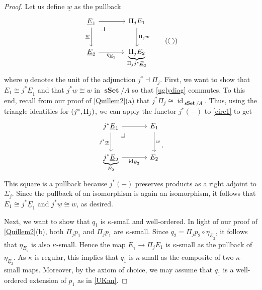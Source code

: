 \documentclass[10pt,letterpaper,cm]{nupset}
\theoremstyle{definition}
\theoremstyle{theorem}
\theoremstyle{remark}
\newcommand{\0}{\mathbf{0}}
\newcommand{\1}{\mathbf{1}}
\newcommand{\2}{\mathbf{2}}
\DeclareMathOperator{\sset}{\mathbf{sSet}}
\DeclareMathOperator{\idd}{id}
\begin{document}
\begin{proof}
Let us define $\underline{w}$ as the pullback
\[ \label{circ1}
\begin{tikzcd}[row sep=large, column sep=large]
\underline{E}_1 \arrow[r] \arrow[d, "\underline{w}"'] \arrow[dr, phantom, "\scalebox{1.5}{\color{black}$\lrcorner$}" , very near start, color=black]
& \Pi_j{E_1} \arrow[d, "\Pi_j{w}"]             \\
\underline{E}_2 \arrow[r, "\eta_{\underline{E}_2}"']                 & \underbrace{\Pi_j{E_2}}_{\Pi_jj^{\ast}{\underline{E}_2}}
\end{tikzcd}  \tag{$\bigcirc$}
\] where $\eta$  denotes the unit of the adjunction $j^{\ast} \dashv \Pi_j$.
First, we want to show that $E_1 \cong j^{\ast}{\underline{E}_1}$ and that $j^{\ast}{\underline{w}} \cong w$ in $\sset/A$ so that \eqref{uglydiag} commutes. To this end, recall from our proof of \cref{Quillem2}(a) that $j^{\ast}{\Pi_j}\cong \idd_{\sset/A}$. Thus, using the triangle identities for $\mleft(j^{\ast}, \Pi_j\mright)$, we can apply the functor $j^{\ast}({-})$ to \eqref{circ1} to get
\[
\begin{tikzcd}[row sep=large, column sep=large]
j^{\ast}{\underline{E}_1} \arrow[d, "j^{\ast}{\underline{w}}"'] \arrow[r]  \arrow[dr, phantom, "\scalebox{1.5}{\color{black}$\lrcorner$}" , very near start, color=black]
& E_1 \arrow[d, "w"] \\
\underbrace{j^{\ast}{\underline{E}_2}}_{E_2} \arrow[r, "\idd_{E_2}"']                      & E_2               
\end{tikzcd}
.\] This square is a pullback because $j^{\ast}({-})$ preserves products as a right adjoint to $\Sigma_j$. Since the pullback of an isomorphism is again an isomorphism, it follows that $E_1 \cong j^{\ast}{\underline{E}_1}$ and  $j^{\ast}{\underline{w}} \cong w$, as desired.

\medskip

Next, we want to show that  $q_1$ is $\kappa$-small and well-ordered. In light of our proof of \cref{Quillem2}(b), both $\Pi_j{p_1}$ and $\Pi_j{p_1}$ are $\kappa$-small. Since $q_2 = \Pi_j{p_2}\circ \eta_{\underline{E}_2}$, it follows that  $\eta_{\underline{E}_2}$ is also  $\kappa$-small. Hence the map $\underline{E}_1 \to \Pi_{j}{E_1}$ is $\kappa$-small as the pullback of  $\eta_{\underline{E}_2}$. As $\kappa$ is regular, this implies that $q_1$ is $\kappa$-small as the composite of two $\kappa$-small maps. Moreover, by the axiom of choice, we may assume that $q_1$ is a well-ordered extension of $p_1$ as in \cref{UKan}.

\medskip


\end{proof}
\end{document}
